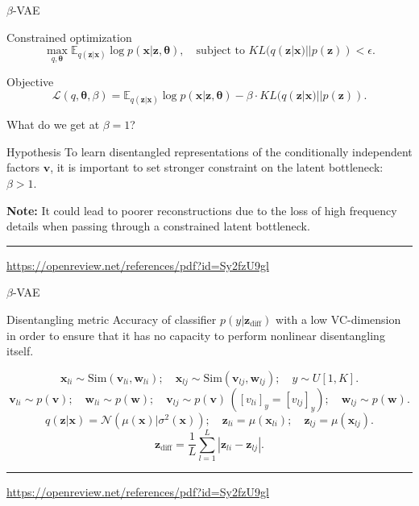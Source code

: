 \documentclass{beamer}
\newcommand{\bv}{\mathbf{v}}
\newcommand{\bw}{\mathbf{w}}
\newcommand{\bx}{\mathbf{x}}
\newcommand{\bz}{\mathbf{z}}
\newcommand{\btheta}{\boldsymbol{\theta}}
\begin{document}
\begin{frame}{$\beta$-VAE}
\begin{block}{Constrained optimization}
\vspace{-0.5cm}
\[
    \max_{q, \btheta} \mathbb{E}_{q(\bz | \bx)} \log p(\bx | \bz, \btheta), \quad \text{subject to } KL (q(\bz | \bx) || p(\bz)) < \epsilon.
\]
\vspace{-0.5cm}
\end{block}
\begin{block}{Objective}
\vspace{-0.5cm}
\[
    \mathcal{L}(q, \btheta, \beta) = \mathbb{E}_{q(\bz | \bx)} \log p(\bx | \bz, \btheta) - \beta \cdot KL (q(\bz | \bx) || p(\bz)).
\]
\end{block}
What do we get at $\beta = 1$? \\
\begin{block}{Hypothesis}
To learn disentangled representations of the conditionally independent factors $\bv$, it is important to set stronger constraint on the latent bottleneck: $\beta > 1$.
\end{block}
\textbf{Note:} It could lead to poorer reconstructions due to the loss of high frequency details when passing through a constrained latent bottleneck. \\ 
\vspace{0.1cm}
\vfill
\hrule\medskip
{\scriptsize \href{https://openreview.net/references/pdf?id=Sy2fzU9gl}{https://openreview.net/references/pdf?id=Sy2fzU9gl}}
\end{frame}
\begin{frame}{$\beta$-VAE}
\begin{block}{Disentangling metric}
Accuracy of classifier $p(y | \bz_{\text{diff}})$ with a low VC-dimension in order to ensure that it has no capacity to perform nonlinear disentangling itself.
\end{block}

\[
    \bx_{li} \sim \text{Sim}(\bv_{li}, \bw_{li}); \quad \bx_{lj} \sim \text{Sim}(\bv_{lj}, \bw_{lj}); \quad y \sim U[1, K].
\]
\[
    \bv_{li} \sim p(\bv); \quad \bw_{li} \sim p(\bw); \quad \bv_{lj} \sim p(\bv) \, ([v_{li}]_y = [v_{lj}]_y); \quad \bw_{lj} \sim p(\bw).
\]
\[
    q(\bz | \bx) = \mathcal{N}\left(\mu(\bx) | \sigma^2(\bx)\right); \quad \bz_{li} = \mu(\bx_{li}); \quad \bz_{lj} = \mu(\bx_{lj}).
\]
\[
    \bz_{\text{diff}} = \frac{1}{L} \sum_{l=1}^L | \bz_{li} - \bz_{lj} |.
\]

\vfill
\hrule\medskip
{\scriptsize \href{https://openreview.net/references/pdf?id=Sy2fzU9gl}{https://openreview.net/references/pdf?id=Sy2fzU9gl}}
\end{frame}
\end{document}
